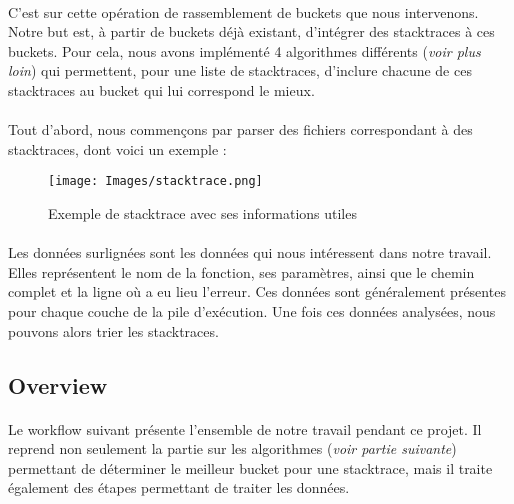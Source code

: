 \documentclass{article}
\begin{document}
\paragraph{}
C'est sur cette opération de rassemblement de buckets que nous intervenons. Notre but est, à partir de buckets déjà existant, d'intégrer des stacktraces à ces buckets. Pour cela, nous avons implémenté 4 algorithmes différents (\textit{voir plus loin}) qui permettent, pour une liste de stacktraces, d'inclure chacune de ces stacktraces au bucket qui lui correspond le mieux.

\paragraph{}
Tout d'abord, nous commençons par parser des fichiers correspondant à des stacktraces, dont voici un exemple :


\begin{figure}[h]
   \texttt{[image: Images/stacktrace.png]}
   \caption{Exemple de stacktrace avec ses informations utiles}
\end{figure}

\paragraph{}
Les données surlignées sont les données qui nous intéressent dans notre travail. Elles représentent le nom de la fonction, ses paramètres, ainsi que le chemin complet et la ligne où a eu lieu l'erreur. Ces données sont généralement présentes pour chaque couche de la pile d'exécution. Une fois ces données analysées, nous pouvons alors trier les stacktraces.

\subsection{Overview}

\paragraph{}
Le workflow suivant présente l'ensemble de notre travail pendant ce projet. Il reprend non seulement la partie sur les algorithmes (\textit{voir partie suivante}) permettant de déterminer le meilleur bucket pour une stacktrace, mais il traite également des étapes permettant de traiter les données.
\end{document}
